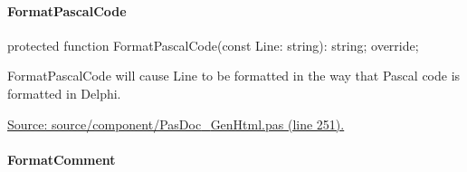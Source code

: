 \documentclass{report}
\newif\ifpdf
\begin{document}
\paragraph*{FormatPascalCode}\hspace*{\fill}

\label{PasDoc_GenHtml.TGenericHTMLDocGenerator-FormatPascalCode}
\begin{list}{}{
\setlength{\itemindent}{0cm}
\setlength{\listparindent}{0cm}
\setlength{\leftmargin}{\evensidemargin}
\addtolength{\leftmargin}{\tmplength}
\settowidth{\labelsep}{X}
\addtolength{\leftmargin}{\labelsep}
\setlength{\labelwidth}{\tmplength}
}
\item[\textbf{Declaration}\hfill]
\ifpdf
\begin{flushleft}
\fi
\begin{ttfamily}
protected function FormatPascalCode(const Line: string): string; override;\end{ttfamily}

\ifpdf
\end{flushleft}
\fi

\par
\item[\textbf{Description}]
FormatPascalCode will cause Line to be formatted in the way that Pascal code is formatted in Delphi.\par
\href{https://github.com/pasdoc/pasdoc/blob/master/source/component/PasDoc_GenHtml.pas#L251}{Source: source/component/PasDoc{\_}GenHtml.pas (line 251).}

\end{list}
\paragraph*{FormatComment}\hspace*{\fill}
\end{document}
